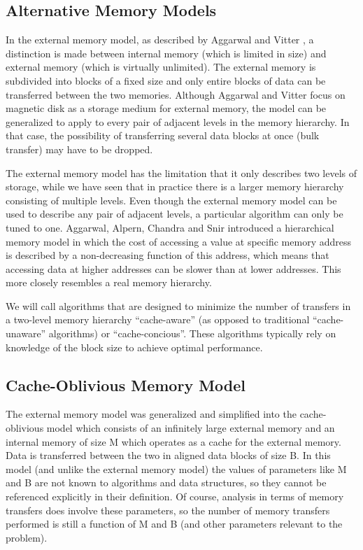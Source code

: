 \documentclass{acm_proc_article-sp}
\begin{document}
\subsection{Alternative Memory Models}
In the external memory model, as described by Aggarwal and Vitter \cite{aggarwal1988ioc}, a distinction is made between internal memory (which is limited in size) and external memory (which is virtually unlimited). The external memory is subdivided into blocks of a fixed size and only entire blocks of data can be transferred between the two memories. Although Aggarwal and Vitter focus on magnetic disk as a storage medium for external memory, the model can be generalized to apply to every pair of adjacent levels in the memory hierarchy. In that case, the possibility of transferring several data blocks at once (bulk transfer) may have to be dropped.

The external memory model has the limitation that it only describes two levels of storage, while we have seen that in practice there is a larger memory hierarchy consisting of multiple levels. Even though the external memory model can be used to describe any pair of adjacent levels, a particular algorithm can only be tuned to one. Aggarwal, Alpern, Chandra and Snir \cite{aggarwal1987mhm} introduced a hierarchical memory model in which the cost of accessing a value at specific memory address is described by a non-decreasing function of this address, which means that accessing data at higher addresses can be slower than at lower addresses. This more closely resembles a real memory hierarchy.

We will call algorithms that are designed to minimize the number of transfers in a two-level memory hierarchy ``cache-aware'' (as opposed to traditional ``cache-unaware'' algorithms) or ``cache-concious''. These algorithms typically rely on knowledge of the block size to achieve optimal performance.

\subsection{Cache-Oblivious Memory Model}
The external memory model was generalized and simplified into the cache-oblivious model \cite{prokop1999coa} which consists of an infinitely large external memory and an internal memory of size M which operates as a cache for the external memory. Data is transferred between the two in aligned data blocks of size B. In this model (and unlike the external memory model) the values of parameters like M and B are not known to algorithms and data structures, so they cannot be referenced explicitly in their definition. Of course, analysis in terms of memory transfers does involve these parameters, so the number of memory transfers performed is still a function of M and B (and other parameters relevant to the problem).
\end{document}
